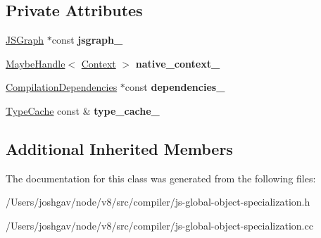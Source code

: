 \subsection*{Private Attributes}
\begin{DoxyCompactItemize}
\item 
\hyperlink{classv8_1_1internal_1_1compiler_1_1_j_s_graph}{J\+S\+Graph} $\ast$const {\bfseries jsgraph\+\_\+}\hypertarget{classv8_1_1internal_1_1compiler_1_1_j_s_global_object_specialization_a31306c3a693c5f88de082f2c0c1b078a}{}\label{classv8_1_1internal_1_1compiler_1_1_j_s_global_object_specialization_a31306c3a693c5f88de082f2c0c1b078a}

\item 
\hyperlink{classv8_1_1internal_1_1_maybe_handle}{Maybe\+Handle}$<$ \hyperlink{classv8_1_1internal_1_1_context}{Context} $>$ {\bfseries native\+\_\+context\+\_\+}\hypertarget{classv8_1_1internal_1_1compiler_1_1_j_s_global_object_specialization_a3fa716c9d500caf190873134c137b8da}{}\label{classv8_1_1internal_1_1compiler_1_1_j_s_global_object_specialization_a3fa716c9d500caf190873134c137b8da}

\item 
\hyperlink{classv8_1_1internal_1_1_compilation_dependencies}{Compilation\+Dependencies} $\ast$const {\bfseries dependencies\+\_\+}\hypertarget{classv8_1_1internal_1_1compiler_1_1_j_s_global_object_specialization_ac570d4dd71930f355771afebae39797e}{}\label{classv8_1_1internal_1_1compiler_1_1_j_s_global_object_specialization_ac570d4dd71930f355771afebae39797e}

\item 
\hyperlink{classv8_1_1internal_1_1_type_cache}{Type\+Cache} const \& {\bfseries type\+\_\+cache\+\_\+}\hypertarget{classv8_1_1internal_1_1compiler_1_1_j_s_global_object_specialization_ab0de88378ec5976682515403d26ce1c6}{}\label{classv8_1_1internal_1_1compiler_1_1_j_s_global_object_specialization_ab0de88378ec5976682515403d26ce1c6}

\end{DoxyCompactItemize}
\subsection*{Additional Inherited Members}


The documentation for this class was generated from the following files\+:\begin{DoxyCompactItemize}
\item 
/\+Users/joshgav/node/v8/src/compiler/js-\/global-\/object-\/specialization.\+h\item 
/\+Users/joshgav/node/v8/src/compiler/js-\/global-\/object-\/specialization.\+cc\end{DoxyCompactItemize}
